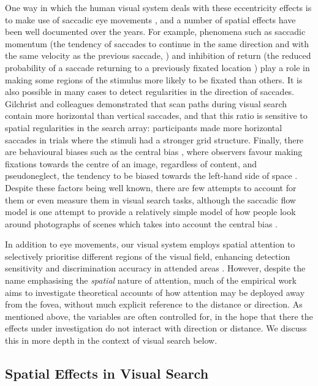 \documentclass[man, floatsintext]{apa7}
\begin{document}
One way in which the human visual system deals with these eccentricity effects is to make use of saccadic eye movements \citep{findlay2003}, and a number of spatial effects have been well documented over the years. For example, phenomena such as saccadic momentum (the tendency of saccades to continue in the same direction and with the same velocity as the previous saccade, \citep{smith2009facilitation, wang2011aftereffects}) and inhibition of return (the reduced probability of a saccade returning to a previously fixated location \citep{klein2000inhibition, macinnes2014driving}) play a role in making some regions of the stimulus more likely to be fixated than others. It is also possible in many cases to detect regularities in the direction of saccades. Gilchrist and colleagues \cite{gilchrist2006} demonstrated that scan paths during visual search contain more horizontal than vertical saccades, and that this ratio is sensitive to spatial regularities in the search array: participants made more horizontal saccades in trials where the stimuli had a stronger grid structure. Finally, there are behavioural biases such as the central bias \citep{clarke_tatler2014}, where observers favour making fixations towards the centre of an image, regardless of content, and pseudoneglect, the tendency to be biased towards the left-hand side of space \citep{brooks2014representational}. Despite these factors being well known, there are few attempts to account for them or even measure them in visual search tasks, although the saccadic flow model is one attempt to provide a relatively simple model of how people look around photographs of scenes which takes into account the central bias \citep{clarke2017, mairon2025polar}. 

In addition to eye movements, our visual system employs spatial attention to selectively prioritise different regions of the visual field, enhancing detection sensitivity and discrimination accuracy in attended areas \citep{posner1980}. However, despite the name emphasising the \textit{spatial} nature of attention,  much of the empirical work aims to investigate theoretical accounts of how attention may be deployed away from the fovea, without much explicit reference to the distance or direction. As mentioned above, the variables are often controlled for, in the hope that there the effects under investigation do not interact with direction or distance. We discuss this in more depth in the context of visual search below. 

\subsection{Spatial Effects in Visual Search}
\end{document}
